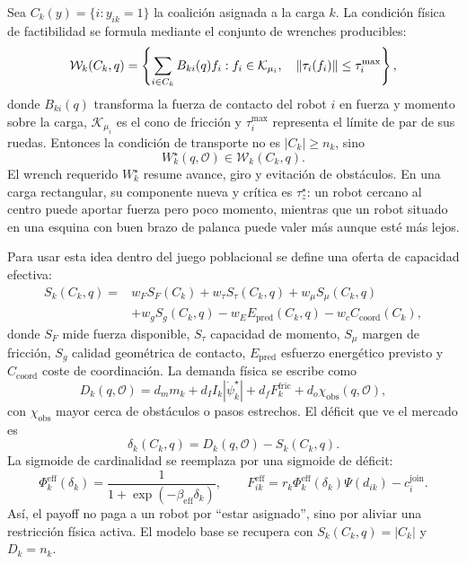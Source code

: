 Sea $C_k(y)=\{i:y_{ik}=1\}$ la coalición asignada a la carga $k$. La condición física de
factibilidad se formula mediante el conjunto de wrenches producibles:
\begin{equation}
  \mathcal{W}_k(C_k,q)=
  \left\{
    \sum_{i\in C_k} B_{ki}(q)f_i:
    f_i\in\mathcal{K}_{\mu_i},\quad
    \left\|\tau_i(f_i)\right\|\leq\tau_i^{\max}
  \right\},
  \label{eq:wrench_set_capacidad}
\end{equation}
donde $B_{ki}(q)$ transforma la fuerza de contacto del robot $i$ en fuerza y momento
sobre la carga, $\mathcal{K}_{\mu_i}$ es el cono de fricción y $\tau_i^{\max}$ representa
el límite de par de sus ruedas. Entonces la condición de transporte no es
$|C_k|\geq n_k$, sino
\begin{equation}
  W_k^{\star}(q,\mathcal{O})\in\mathcal{W}_k(C_k,q).
  \label{eq:factibilidad_wrench}
\end{equation}
El wrench requerido $W_k^\star$ resume avance, giro y evitación de obstáculos. En una
carga rectangular, su componente nueva y crítica es $\tau_z^\star$: un robot cercano al
centro puede aportar fuerza pero poco momento, mientras que un robot situado en una
esquina con buen brazo de palanca puede valer más aunque esté más lejos.

Para usar esta idea dentro del juego poblacional se define una oferta de capacidad
efectiva:
\begin{equation}
  \begin{aligned}
  S_k(C_k,q)={}&
  w_F S_F(C_k)
  +w_\tau S_\tau(C_k,q)
  +w_\mu S_\mu(C_k,q)\\
  &+w_g S_g(C_k,q)
  -w_E E_{\mathrm{pred}}(C_k,q)
  -w_c C_{\mathrm{coord}}(C_k),
  \end{aligned}
  \label{eq:oferta_capacidad_efectiva}
\end{equation}
donde $S_F$ mide fuerza disponible, $S_\tau$ capacidad de momento, $S_\mu$ margen de
fricción, $S_g$ calidad geométrica de contacto, $E_{\mathrm{pred}}$ esfuerzo energético
previsto y $C_{\mathrm{coord}}$ coste de coordinación. La demanda física se escribe como
\begin{equation}
  D_k(q,\mathcal{O})=
  d_m m_k+d_I I_k|\dot\psi_k^\star|
  +d_f F_k^{\mathrm{fric}}
  +d_o\chi_{\mathrm{obs}}(q,\mathcal{O}),
  \label{eq:demanda_capacidad_efectiva}
\end{equation}
con $\chi_{\mathrm{obs}}$ mayor cerca de obstáculos o pasos estrechos. El déficit que
ve el mercado es
\begin{equation}
  \delta_k(C_k,q)=D_k(q,\mathcal{O})-S_k(C_k,q).
  \label{eq:deficit_capacidad_efectiva}
\end{equation}
La sigmoide de cardinalidad se reemplaza por una sigmoide de déficit:
\begin{equation}
  \Phi_k^{\mathrm{eff}}(\delta_k)=
  \frac{1}{1+\exp(-\beta_{\mathrm{eff}}\delta_k)},
  \qquad
  F_{ik}^{\mathrm{eff}}=
  r_k\Phi_k^{\mathrm{eff}}(\delta_k)\Psi(d_{ik})-c_i^{\mathrm{join}}.
  \label{eq:payoff_capacidad_efectiva}
\end{equation}
Así, el payoff no paga a un robot por ``estar asignado'', sino por aliviar una restricción
física activa. El modelo base se recupera con
$S_k(C_k,q)=|C_k|$ y $D_k=n_k$.

